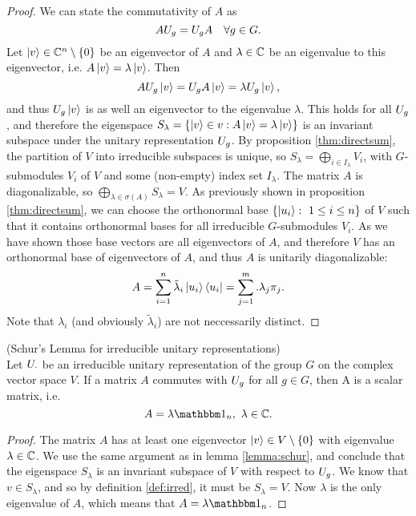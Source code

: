 \documentclass[a4paper,11pt, BCOR=4mm, DIV=12, pagesize]{scrartcl}
\begin{document}
\begin{proof}
 We can state the commutativity of $A$ as 
 \begin{equation*}
  AU_{g} = U_{g}A\quad \forall g\in G.
 \end{equation*}
 Let $\ket{v}\in\mathbb{C}^n\setminus\{0\}$ be  
an eigenvector of $A$ and $\lambda\in\mathbb{C}$ be an eigenvalue to this eigenvector, 
i.e. $A\ket{v} = \lambda\ket{v}$. 
Then 
 \begin{equation*}
  AU_{g}\ket{v} = U_{g}A\ket{v} = \lambda U_{g}\ket{v},
 \end{equation*}
 and thus $U_{g}\ket{v}$ is as well an eigenvector to the eigenvalue 
 $\lambda$. This holds for all $U_{g}$, and therefore the eigenspace 
 $S_\lambda = \left\{\ket{v}\in v: A\ket{v} = \lambda\ket{v} \right\}$ is 
 an invariant subspace under the unitary representation $U_{g}$. By 
proposition \ref{thm:directsum}, the partition of $V$ into irreducible 
subspaces is unique, so $S_\lambda = \bigoplus_{i\in I_\lambda} V_i$, 
with $G$-submodules $V_i$ of $V$ and some (non-empty) index set $I_\lambda$. 
The matrix $A$ is diagonalizable, so $\bigoplus_{\lambda\in\sigma(A)} 
S_\lambda = V$. As previously shown in proposition \ref{thm:directsum}, we can 
choose the orthonormal base $\left\{\ket{u_i}:\ 1\leq i\leq n\right\}$ of $V$ 
such that it contains orthonormal bases for all irreducible $G$-submodules 
$V_i$. As we have shown those base vectors are all eigenvectors of $A$, and 
therefore $V$ has an orthonormal base of eigenvectors of $A$, and thus $A$ is 
unitarily diagonalizable:
\begin{equation*}
 A = \sum\limits_{i=1}^{n} \tilde{\lambda}_i \ket{u_i}\bra{u_i} = \sum\limits_{j=1}^{m}.
\lambda_j \pi_j.
\end{equation*}
Note that $\lambda_i$ (and obviously $\tilde{\lambda}_i$) are not neccessarily 
distinct.

\end{proof}

\begin{cor}(Schur's Lemma for irreducible unitary representations)\\
 Let $U_{\cdot}$ be an irreducible unitary 
 representation of the group $G$ on the complex vector space $V$. If a matrix 
$A$ commutes with  $U_{g}$ 
 for all $g\in G$, then A is a scalar matrix, i.e. 
 \begin{equation}
  A = \lambda \ind_n,\ \lambda\in\C.
 \end{equation}
\end{cor}
\begin{proof}
 The matrix $A$ has at least one eigenvector $\ket{v}\in V\setminus\{0\}$ with 
eigenvalue $\lambda\in\mathbb{C}$. We use the same argument as in lemma 
\ref{lemma:schur}, and conclude that the eigenspace $S_\lambda$ is an invariant 
subspace of $V$ with respect to $U_{g}$. We know that $v\in S_\lambda$, 
and so by definition \ref{def:irred}, it must be $S_\lambda = V$. Now $\lambda$ 
is the only eigenvalue of $A$, which means that $A=\lambda\ind_n$.
\end{proof}
\end{document}
